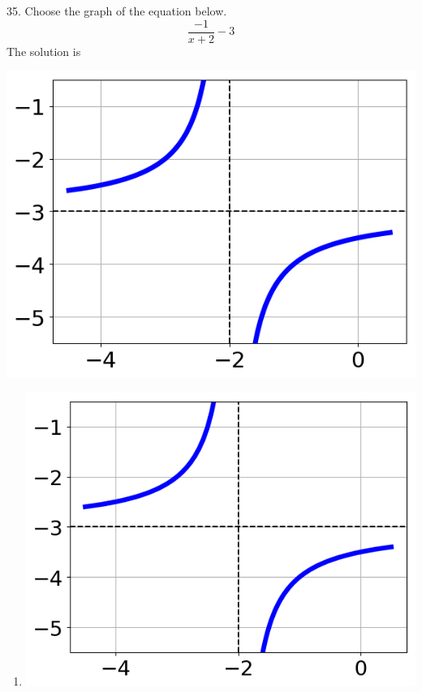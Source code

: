 \documentclass{article}[10pt]
\begin{document}
35. Choose the graph of the equation below.
$$ \frac{-1}{x + 2} - 3 $$ 
The solution is  
\begin{center}\includegraphics[scale=0.5]{../Figures/question35BB.png}\end{center}\begin{enumerate}[label=\Alph*.] 
\item  
\begin{center}\includegraphics[scale=0.5]{../Figures/question35BB.png}\end{center} 
 

\end{enumerate}
\end{document}
